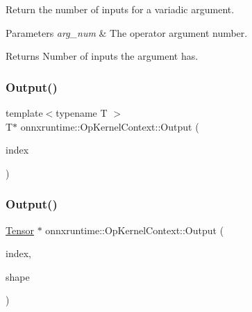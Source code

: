 Return the number of inputs for a variadic argument. 
\begin{DoxyParams}{Parameters}
{\em arg\+\_\+num} & The operator argument number. \\
\hline
\end{DoxyParams}
\begin{DoxyReturn}{Returns}
Number of inputs the argument has. 
\end{DoxyReturn}
\mbox{\label{classonnxruntime_1_1OpKernelContext_a6d56830ba7a73e38d8c5ca92699b8c69}} 
\subsubsection{\texorpdfstring{Output()}{Output()}\hspace{0.1cm}{\footnotesize\ttfamily [1/3]}}
{\footnotesize\ttfamily template$<$typename T $>$ \\
T$\ast$ onnxruntime\+::\+Op\+Kernel\+Context\+::\+Output (\begin{DoxyParamCaption}\item[{int}]{index }\end{DoxyParamCaption})\hspace{0.3cm}{\ttfamily [inline]}}

\mbox{\label{classonnxruntime_1_1OpKernelContext_a1aa7d10ea6fd4770151e30e3e6891cd9}} 
\subsubsection{\texorpdfstring{Output()}{Output()}\hspace{0.1cm}{\footnotesize\ttfamily [2/3]}}
{\footnotesize\ttfamily \mbox{\hyperlink{classonnxruntime_1_1Tensor}{Tensor}} $\ast$ onnxruntime\+::\+Op\+Kernel\+Context\+::\+Output (\begin{DoxyParamCaption}\item[{int}]{index,  }\item[{const \mbox{\hyperlink{classonnxruntime_1_1TensorShape}{Tensor\+Shape}} \&}]{shape }\end{DoxyParamCaption})}

